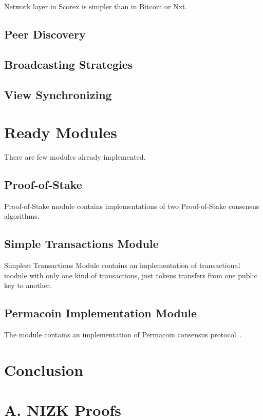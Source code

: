 \documentclass[]{report}   %
\begin{document}
Network layer in Scorex is simpler than in Bitcoin or Nxt. 

\subsection{Peer Discovery}

\subsection{Broadcasting Strategies}

\subsection{View Synchronizing}

\section{Ready Modules}
There are few modules already implemented.

\subsection{Proof-of-Stake}
Proof-of-Stake module contains implementations of two Proof-of-Stake consensus algorithms. 

\subsection{Simple Transactions Module}

Simplest Transactions Module contains an implementation of transactional module with only one kind of transactions, just tokens transfers from one public key to another.

\subsection{Permacoin Implementation Module}

The module contains an implementation of Permacoin consensus protocol~\cite{miller2014permacoin}.

\section{Conclusion}



\appendix
\section*{A. NIZK Proofs}
\end{document}
